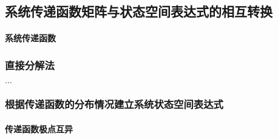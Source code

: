 \documentclass[11pt]{article}
\begin{document}
\subsection{系统传递函数矩阵与状态空间表达式的相互转换}

\paragraph{系统传递函数}%
\label{par:系统传递函数}

\subsubsection{直接分解法}%
\label{ssub:直接分解法}

$\ldots$

\subsubsection{根据传递函数的分布情况建立系统状态空间表达式}

\paragraph{传递函数极点互异}%
\label{par:传递函数极点互异}
\end{document}
